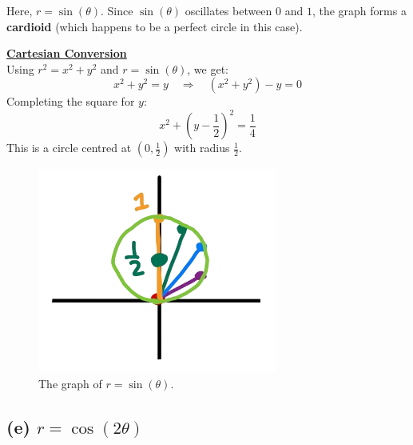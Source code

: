 \documentclass{article}
\begin{document}
\begin{solutionbox}
Here, \( r = \sin(\theta) \). Since \( \sin(\theta) \) oscillates between \( 0 \) and \( 1 \), the graph forms a \textbf{cardioid} (which happens to be a perfect circle in this case).

\begin{conceptbox}
    \textbf{\underline{Cartesian Conversion}} \\ 
    Using \( r^2 = x^2 + y^2 \) and \( r = \sin(\theta) \), we get:
    \[
    x^2 + y^2 = y \quad \Rightarrow \quad \left(x^2 + y^2\right) - y = 0
    \]
    Completing the square for \( y \):
    \[
    x^2 + \left(y - \frac{1}{2}\right)^2 = \frac{1}{4}
    \]
    This is a circle centred at \( (0, \frac{1}{2}) \) with radius \( \frac{1}{2} \).
\end{conceptbox}
\begin{figure}[H]
    \centering
    \includegraphics[width=0.7\textwidth]{polar curve sketch d.png}
    \caption{The graph of \( r = \sin(\theta) \).}
    \label{fig:cardioid_graph}
\end{figure}
\end{solutionbox}

\subsection*{(e) \( r = \cos(2\theta) \)}
\end{document}
